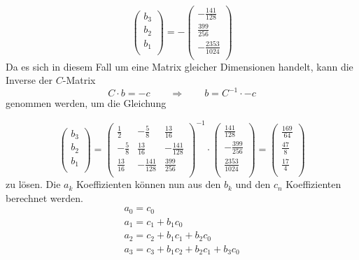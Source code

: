 \begin{beispiel}
\[\begin{pmatrix}
b_{3}\\
b_{2}\\
b_{1}\\
\end{pmatrix}
=
-
\begin{pmatrix}
-\frac{141}{128}\\
\frac{399}{256}\\
-\frac{2353}{1024}\\
\end{pmatrix}
\]
Da es sich in diesem Fall um eine Matrix gleicher Dimensionen handelt, kann die Inverse der $C$-Matrix 
\begin{equation}
C\cdot b = -c
\qquad\Rightarrow\qquad
b = C^{-1} \cdot -c
\end{equation}
genommen werden, um die Gleichung 

\[
\renewcommand\arraystretch{1.25}
\begin{pmatrix}
b_{3}\\
b_{2}\\
b_{1}\\
\end{pmatrix}
=
\begin{pmatrix}
\frac{1}{2} & -\frac{5}{8} & \frac{13}{16}\\
-\frac{5}{8} & \frac{13}{16}& -\frac{141}{128}\\
\frac{13}{16} & -\frac{141}{128} & \frac{399}{256} \\
\end{pmatrix}^{-1}
\cdot
\begin{pmatrix}
\frac{141}{128}\\
-\frac{399}{256}\\
\frac{2353}{1024}\\
\end{pmatrix}
=
\begin{pmatrix}
\frac{169}{64}\\
\frac{47}{8}\\
\frac{17}{4}\\
\end{pmatrix}
\]
zu lösen.
Die $a_k$ Koeffizienten können nun aus den $b_k$ und den $c_n$ Koeffizienten berechnet werden.
\begin{equation}
\begin{array}{l}
a_{0}=c_{0} \\
a_{1}=c_{1}+b_{1} c_{0} \\
a_{2}=c_{2}+b_{1} c_{1}+b_{2} c_{0} \\
a_{3}=c_{3}+b_{1} c_{2}+b_{2} c_{1} + b_{3} c_{0} \\

\end{array}
\end{equation}
\end{beispiel}
